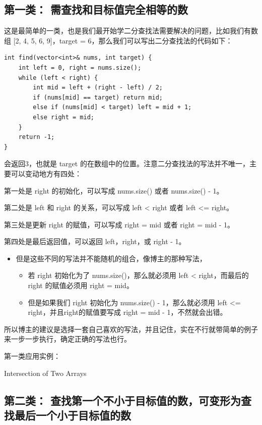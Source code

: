 \documentclass[9pt, b5paaper]{book}
\begin{document}
\subsection{第一类： 需查找和目标值完全相等的数}
\label{sec-5-1-6}

这是最简单的一类，也是我们最开始学二分查找法需要解决的问题，比如我们有数组 [2, 4, 5, 6, 9]，target = 6，那么我们可以写出二分查找法的代码如下：
\begin{verbatim}
int find(vector<int>& nums, int target) {
    int left = 0, right = nums.size();
    while (left < right) {
        int mid = left + (right - left) / 2;
        if (nums[mid] == target) return mid;
        else if (nums[mid] < target) left = mid + 1;
        else right = mid;
    }
    return -1;
}
\end{verbatim}

会返回3，也就是 target 的在数组中的位置。注意二分查找法的写法并不唯一，主要可以变动地方有四处：

第一处是 right 的初始化，可以写成 nums.size() 或者 nums.size() - 1。

第二处是 left 和 right 的关系，可以写成 left < right 或者 left <= right。

第三处是更新 right 的赋值，可以写成 right = mid 或者 right = mid - 1。

第四处是最后返回值，可以返回 left，right，或 right - 1。

\begin{itemize}
\item 但是这些不同的写法并不能随机的组合，像博主的那种写法，
\begin{itemize}
\item 若 right 初始化为了 nums.size()，那么就必须用 left < right，而最后的 right 的赋值必须用 right = mid。
\item 但是如果我们 right 初始化为 nums.size() - 1，那么就必须用 left <= right，并且right的赋值要写成 right = mid - 1，不然就会出错。
\end{itemize}
\end{itemize}

所以博主的建议是选择一套自己喜欢的写法，并且记住，实在不行就带简单的例子来一步一步执行，确定正确的写法也行。

第一类应用实例：

Intersection of Two Arrays

\subsection{第二类： 查找第一个不小于目标值的数，可变形为查找最后一个小于目标值的数}
\label{sec-5-1-7}
\end{document}
